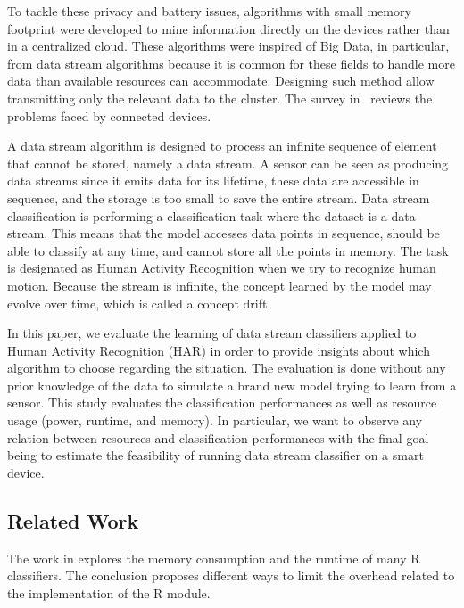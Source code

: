 To tackle these privacy and battery issues,
algorithms with small memory footprint were
developed to mine information directly on the
devices rather than in a centralized cloud.  These
algorithms were inspired of Big Data, in
particular, from data stream algorithms because it
is common for these fields to handle more data
than available resources can accommodate.
Designing such method allow transmitting only the
relevant data to the cluster. The survey
in~\cite{kejariwal2015} reviews the problems faced
by connected devices.

A data stream algorithm is designed to process an
infinite sequence of element that cannot be
stored, namely a data stream. A sensor can be
seen as producing data streams since it emits data
for its lifetime, these data are accessible in
sequence, and the storage is too small to save the
entire stream. Data stream classification is
performing a classification task where the dataset
is a data stream. This means that the model
accesses data points in sequence, should be able
to classify at any time, and cannot store all the
points in memory. The task is designated as Human Activity
Recognition when we try to recognize human motion.
Because the stream is infinite, the concept
learned by the model may evolve over time, which is
called a concept drift.

In this paper, we evaluate the learning of data
stream classifiers applied to Human Activity
Recognition (HAR) in order to provide insights
about which algorithm to choose regarding the
situation. The evaluation is done without any
prior knowledge of the data to simulate a brand
new model trying to learn from a sensor. This
study evaluates the classification performances as
well as resource usage (power, runtime, and
memory). In particular, we want to observe any
relation between resources and classification
performances with the final goal being to estimate the
feasibility of running data stream classifier
on a smart device.


\subsection{Related Work}
The work in \cite{memory_consumption_machine_learning}
explores the memory consumption and
the runtime of many R classifiers. The conclusion proposes different ways to
limit the overhead related to the implementation of the R module.

